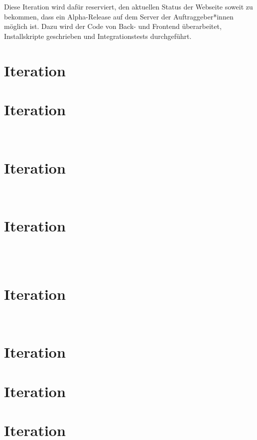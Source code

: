 \documentclass
[english,accentcolor=tud1c]
{tudreport}
\begin{document}
	Diese Iteration wird dafür reserviert, den aktuellen Status der Webseite soweit zu bekommen, dass ein Alpha-Release auf dem Server der Auftraggeber*innen möglich ist. Dazu wird der Code von Back- und Frontend überarbeitet, Installskripte geschrieben und Integrationstests durchgeführt.

	\chapter{Iteration}
	

	\chapter{Iteration}
	\\
	

	\chapter{Iteration}
	\\
	

	\chapter{Iteration}
	\\
	\\
	

	\chapter{Iteration}
	\\
	

	\chapter{Iteration}


	\chapter{Iteration}

	\chapter{Iteration}
	\\
	\\
	\\
	
	\\
\end{document}
